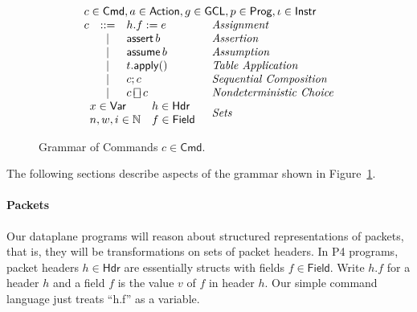 \documentclass{article}
\newcommand{\Cmd}{\mathsf{Cmd}}
\newcommand{\Action}{\mathsf{Action}}
\newcommand{\Instr}{\mathsf{Instr}}
\newcommand{\Prog}{\mathsf{Prog}}
\newcommand{\GCL}{\mathsf{GCL}}
\newcommand{\Hdr}{\mathsf{Hdr}}
\newcommand{\Field}{\mathsf{Field}}
\newcommand{\Var}{\mathsf{Var}}
\newcommand{\assert}{\mathop{\mathsf{assert}}}
\newcommand{\assume}{\mathop{\mathsf{assume}}}
\newcommand{\apply}{\mathsf{apply}}
\newcommand{\choiceop}{\rotatebox[origin=c]{90}{$\sqsubset\!\!\!\sqsupset$}}
\newcommand{\choice}{\mathbin{\choiceop}}
\newcommand{\havoc}[1]{\mathop{\textsf{havoc}}#1}
\begin{document}
\begin{figure}[htp]
\[\begin{array}{lclll}
    \multicolumn{4}{l}{c \in \Cmd, a \in \Action, g \in \GCL, p \in \Prog, \iota \in \Instr } \\
    c & ::=  & h.f := e & \textit{Assignment}\\
      & \mid & \assert b & \textit{Assertion}\\
      & \mid & \assume b & \textit{Assumption} \\
      & \mid & t.\apply() & \textit{Table Application} \\
      & \mid & c;c & \textit{Sequential Composition} \\
      & \mid & c \choice c & \textit{Nondeterministic Choice} \\
    \multicolumn{3}{l}{
      \begin{array}{ll}
        x \in \Var & h \in \Hdr\\
        n,w,i \in \mathbb{N} & f \in \Field
    \end{array}} & \textit{Sets }\\
  \end{array}
\]
\caption{Grammar of Commands $c \in \Cmd$.}
\label{fig:grammar}
\end{figure}

The following sections describe aspects of the grammar shown in Figure~\ref{fig:grammar}.

\paragraph{Packets}
Our dataplane programs will reason about structured representations of packets,
that is, they will be transformations on sets of packet headers. In P4 programs,
packet headers $h \in \Hdr$ are essentially structs with fields $f \in \Field$.
Write $h.f$ for a header $h$ and a field $f$ is the value $v$ of $f$ in header
$h$. Our simple command language just treats ``h.f'' as a variable.
\end{document}
